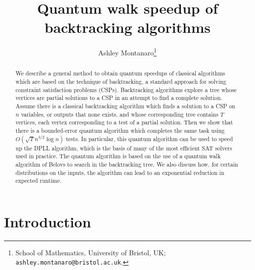 \documentclass[11pt]{article}
\begin{document}
\title{Quantum walk speedup of backtracking algorithms}
\author{Ashley Montanaro\thanks{School of Mathematics, University of Bristol, UK; {\tt ashley.montanaro@bristol.ac.uk}.}}
\maketitle

\begin{abstract}
We describe a general method to obtain quantum speedups of classical algorithms which are based on the technique of backtracking, a standard approach for solving constraint satisfaction problems (CSPs). Backtracking algorithms explore a tree whose vertices are partial solutions to a CSP in an attempt to find a complete solution. Assume there is a classical backtracking algorithm which finds a solution to a CSP on $n$ variables, or outputs that none exists, and whose corresponding tree contains $T$ vertices, each vertex corresponding to a test of a partial solution. Then we show that there is a bounded-error quantum algorithm which completes the same task using $O(\sqrt{T} n^{3/2} \log n)$ tests. In particular, this quantum algorithm can be used to speed up the DPLL algorithm, which is the basis of many of the most efficient SAT solvers used in practice. The quantum algorithm is based on the use of a quantum walk algorithm of Belovs to search in the backtracking tree. We also discuss how, for certain distributions on the inputs, the algorithm can lead to an exponential reduction in expected runtime.
\end{abstract}


\section{Introduction}
\end{document}

